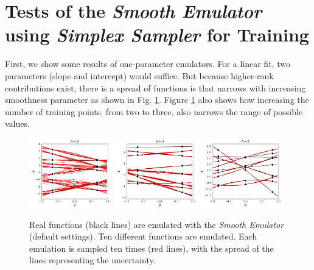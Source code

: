 \documentclass[UserManual.tex]{subfiles}
\begin{document}
\section{Tests of the {\it Smooth Emulator} using {\it Simplex Sampler} for Training}

First, we show some results of one-parameter emulators. For a linear fit, two parameters (slope and intercept) would suffice. But because higher-rank contributions exist, there is a spread of functions is that narrows with increasing smoothness parameter as shown in Fig. \ref{fig:onedim}. Figure \ref{fig:onedim} also shows how increasing the number of training points, from two to three, also narrows the range of possible values. 
\begin{figure}
\includegraphics[width=0.32\textwidth]{onepar2points/onepartest_Lambda2}\hspace*{0.02\textwidth}
\includegraphics[width=0.32\textwidth]{onepar2points/onepartest_Lambda4}\hspace*{0.02\textwidth}
\includegraphics[width=0.32\textwidth]{onepar3points/onepartest_Lambda2}
\caption{\label{fig:onedim}
Real functions (black lines) are emulated with the {\it Smooth Emulator} (default settings). Ten different functions are emulated. Each emulation is sampled ten times (red lines), with the spread of the lines representing the uncertainty.}
\end{figure}
\end{document}
